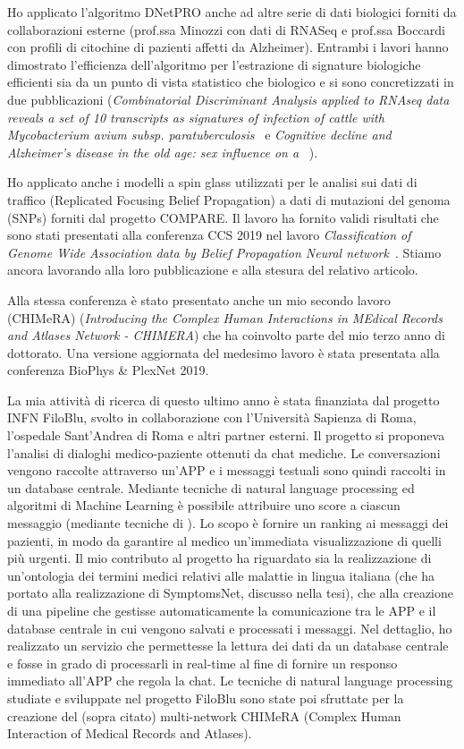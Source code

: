 \documentclass{standalone}
\begin{document}
Ho applicato l'algoritmo DNetPRO anche ad altre serie di dati biologici forniti da collaborazioni esterne (prof.ssa Minozzi con dati di RNASeq e prof.ssa Boccardi con profili di citochine di pazienti affetti da Alzheimer).
Entrambi i lavori hanno dimostrato l'efficienza dell'algoritmo per l'estrazione di signature biologiche efficienti sia da un punto di vista statistico che biologico e si sono concretizzati in due pubblicazioni (\emph{Combinatorial Discriminant Analysis applied to RNAseq data reveals a set of 10 transcripts as signatures of infection of cattle with Mycobacterium avium subsp. paratuberculosis}~\cite{Malvisi2019} e \emph{Cognitive decline and Alzheimer’s disease in the old age: sex influence on a }~\cite{Boccardi2019}).

Ho applicato anche i modelli a spin glass utilizzati per le analisi sui dati di traffico (Replicated Focusing Belief Propagation) a dati di mutazioni del genoma (SNPs) forniti dal progetto COMPARE.
Il lavoro ha fornito validi risultati che sono stati presentati alla conferenza CCS 2019 nel lavoro \emph{Classification of Genome Wide Association data by Belief Propagation Neural network}~\cite{DallOlioCCS19}.
Stiamo ancora lavorando alla loro pubblicazione e alla stesura del relativo articolo.

Alla stessa conferenza è stato presentato anche un mio secondo lavoro (CHIMeRA) (\emph{Introducing the Complex Human Interactions in MEdical Records and Atlases Network - CHIMERA}) che ha coinvolto parte del mio terzo anno di dottorato.
Una versione aggiornata del medesimo lavoro è stata presentata alla conferenza BioPhys \& PlexNet 2019.

La mia attività di ricerca di questo ultimo anno è stata finanziata dal progetto INFN FiloBlu, svolto in collaborazione con l'Università Sapienza di Roma, l'ospedale Sant'Andrea di Roma e altri partner esterni.
Il progetto si proponeva l'analisi di dialoghi medico-paziente ottenuti da chat mediche.
Le conversazioni vengono raccolte attraverso un'APP e i messaggi testuali sono quindi raccolti in un database centrale.
Mediante tecniche di natural language processing ed algoritmi di Machine Learning è possibile attribuire uno score a ciascun messaggio (mediante tecniche di ).
Lo scopo è fornire un ranking ai messaggi dei pazienti, in modo da garantire al medico un'immediata visualizzazione di quelli più urgenti.
Il mio contributo al progetto ha riguardato sia la realizzazione di un'ontologia dei termini medici relativi alle malattie in lingua italiana (che ha portato alla realizzazione di SymptomsNet, discusso nella tesi), che alla creazione di una pipeline che gestisse automaticamente la comunicazione tra le APP e il database centrale in cui vengono salvati e processati i messaggi.
Nel dettaglio, ho realizzato un servizio che permettesse la lettura dei dati da un database centrale e fosse in grado di processarli in real-time al fine di fornire un responso immediato all'APP che regola la chat.
Le tecniche di natural language processing studiate e sviluppate nel progetto FiloBlu sono state poi sfruttate per la creazione del (sopra citato) multi-network CHIMeRA (Complex Human Interaction of Medical Records and Atlases).
\end{document}
